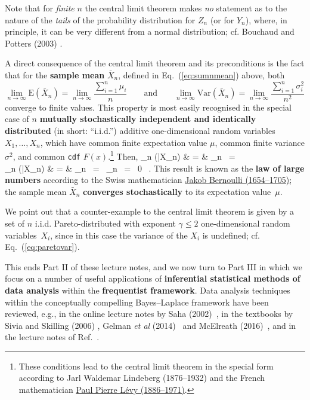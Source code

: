 \medskip
\noindent
Note that for \textit{finite} $n$ the central limit theorem makes 
\textit{no} statement as to the nature of the \textit{tails} of the 
probability distribution for $Z_{n}$ (or for $Y_{n}$), where, in 
principle, it can be very different from a normal distribution; 
cf. Bouchaud and Potters (2003) .

\medskip
\noindent
A direct consequence of the central limit theorem and its 
preconditions is the fact that for the \textbf{sample mean} 
$\bar{X}_{n}$, defined in Eq.~(\ref{eq:sumnmean}) above, both
%
\[
\lim_{n \to \infty}\mathrm{E}(\bar{X}_{n})
= \lim_{n \to \infty}\frac{{\displaystyle\sum_{i=1}^{n}\mu_{i}}}{n}
\quad\quad\text{and}\quad\quad
\lim_{n \to \infty}\mathrm{Var}(\bar{X}_{n})
= \lim_{n \to 
\infty}\frac{{\displaystyle\sum_{i=1}^{n}\sigma_{i}^{2}}}{n^{2}}
\]
%
converge to finite values. This property is most easily recognised
in the special case of $n$ \textbf{mutually stochastically 
independent and identically distributed} (in short: ``i.i.d.'') 
additive one-dimensional random variables $X_{1}, \ldots, X_{n}$, 
which have common finite expectation value $\mu$, common finite 
variance $\sigma^{2}$, and common \texttt{cdf}
$F(x)$.\footnote{These conditions lead to the central limit theorem
in the special form according to Jarl Waldemar Lindeberg
(1876--1932) and the French mathematician 
\href{http://en.wikipedia.org/wiki/Paul_Pierre_Levy}{Paul Pierre 
L\'{e}vy (1886--1971)}.} Then,
%
\bea
\lim_{n \to \infty}(\bar{X}_{n})
& = & \lim_{n \to \infty}
\ = \ \mu \\
%
\lim_{n \to \infty}(\bar{X}_{n})
& = & \lim_{n \to \infty}
\ = \ \lim_{n \to \infty}
\ = \ 0 \ .
\eea
%
This result is known as the \textbf{law of large numbers} according 
to the Swiss mathematician 
\href{http://www-history.mcs.st-and.ac.uk/Biographies/Bernoulli_Jacob.html}{Jakob Bernoulli (1654--1705)}; the sample mean 
$\bar{X}_{n}$ \textbf{converges stochastically} to its expectation 
value~$\mu$.

\medskip
\noindent
We point out that a counter-example to the central limit theorem 
is given by a set of $n$ i.i.d. Pareto-distributed with exponent 
$\gamma \leq 2$ one-dimensional random variables~$X_{i}$, since in 
this case the variance of the $X_{i}$ is undefined; cf. 
Eq.~(\ref{eq:paretovar}).

\vspace{5mm}
\noindent
This ends Part II of these lecture notes, and we now turn to Part 
III in which we focus on a number of useful applications of 
\textbf{inferential statistical methods of data analysis} 
within the \textbf{frequentist framework}. Data analysis techniques
within the conceptually compelling Bayes--Laplace framework have
been reviewed, e.g., in the online lecture notes by Saha
(2002)~, in the textbooks by Sivia and Skilling (2006)
, Gelman \textit{et al} (2014)~ and
McElreath (2016)~, and in the lecture notes of
Ref.~.

